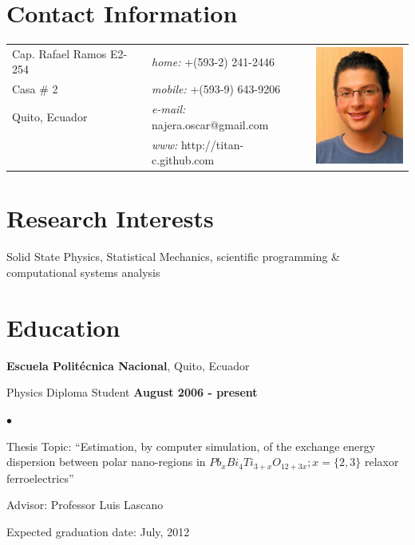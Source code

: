 \documentclass[margin,line]{res}
\newenvironment{list1}{
  \begin{list}{\ding{113}}{%
      \setlength{\itemsep}{0in}
      \setlength{\parsep}{0in} \setlength{\parskip}{0in}
      \setlength{\topsep}{0in} \setlength{\partopsep}{0in} 
      \setlength{\leftmargin}{0.17in}}}{\end{list}}
\newenvironment{list2}{
  \begin{list}{$\bullet$}{%
      \setlength{\itemsep}{0in}
      \setlength{\parsep}{0in} \setlength{\parskip}{0in}
      \setlength{\topsep}{0in} \setlength{\partopsep}{0in} 
      \setlength{\leftmargin}{0.2in}}}{\end{list}}
\begin{document}

\begin{resume}

\section{\sc Contact Information}
  \begin{tabular}{@{}p{2in}p{2.5in}p{3cm} }
    Cap. Rafael Ramos E2-254		& {\it home:}  +(593-2) 241-2446 &
      \multirow{4}{*}{ \includegraphics[width=3cm,bb=0 0 500 665]{./foto.jpg}}\\
    Casa \# 2			& {\it mobile:} +(593-9) 643-9206 \\
    Quito, Ecuador		& {\it e-mail:}  najera.oscar@gmail.com\\
				& {\it www:} http://titan-c.github.com
  \end{tabular}\vspace{2cm}


\section{\sc Research Interests}
  Solid State Physics, Statistical Mechanics, scientific programming \&
  computational systems analysis

\section{\sc Education}
  {\bf Escuela Politécnica Nacional}, Quito, Ecuador\\
  \vspace{-.1in}
  \begin{list1}
    \item[] Physics Diploma Student \hfill {\bf August 2006 - present}\\
    \begin{list2}
    \vspace{-.1in}
      \item Thesis Topic:  ``Estimation, by computer simulation, of the exchange
	energy dispersion between polar nano-regions in $Pb_xBi_4Ti_{3+x}O_{12+3x}; x=\{2,3\}$
	relaxor ferroelectrics''
      \item Advisor: Professor Luis Lascano
      \item Expected graduation date: July, 2012
    \end{list2}
  \end{list1}


\end{resume}
\end{document}

